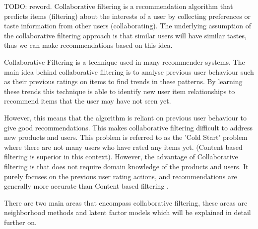 \cite{schafer2007collaborative}

TODO: reword.
Collaborative filtering is a recommendation algorithm that predicts items (filtering) about the interests of a user by collecting preferences or taste information from other users (collaborating). The underlying assumption of the collaborative filtering approach is that similar users will have similar tastes, thus we can make recommendations based on this idea. 

Collaborative Filtering is a technique used in many recommender systems. The main idea behind collaborative filtering is to analyse previous user behaviour such as their previous ratings on items to find trends in these patterns. By learning these trends this technique is able to identify new user item relationships to recommend items that the user may have not seen yet. 


However, this means that the algorithm is reliant on previous user behaviour to give good recommendations. This makes collaborative filtering difficult to address new products and users. This problem is referred to as the 'Cold Start' problem where there are not many users who have rated any items yet. (Content based filtering is superior in this context). However, the advantage of Collaborative filtering is that does not require domain knowledge of the products and users. It purely focuses on the previous user rating actions, and recommendations are generally more accurate than Content based filtering \cite{koren2009matrix}. 

There are two main areas that encompass collaborative filtering, these areas are neighborhood methods and latent factor models which will be explained in detail further on. 


